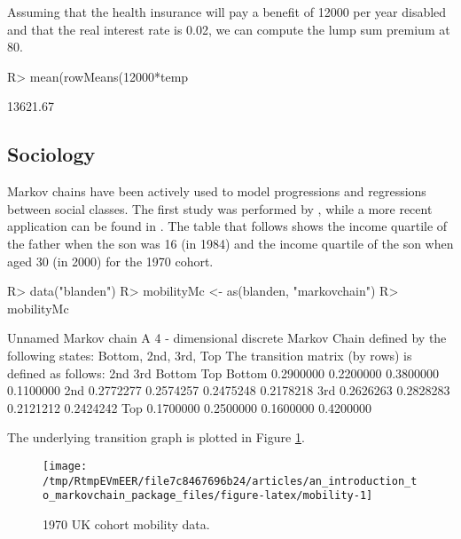 \documentclass[
  nojss]{jss}
\begin{document}
Assuming that the health insurance will pay a benefit of 12000 per year disabled and that the real interest rate is 0.02, we can compute the lump sum premium at 80.

\begin{CodeChunk}

\begin{CodeInput}
R> mean(rowMeans(12000*temp%
\end{CodeInput}

\begin{CodeOutput}
[1] 13621.67
\end{CodeOutput}
\end{CodeChunk}

\hypertarget{app:sociology}{%
\subsection{Sociology}\label{app:sociology}}

Markov chains have been actively used to model progressions and regressions between social classes. The first study was performed by \cite{glassHall}, while a more recent application can be found in \cite{blandenEtAlii}. The table that follows shows the income quartile of the father when the son was 16 (in 1984) and the income quartile of the son when aged 30 (in 2000) for the 1970 cohort.

\begin{CodeChunk}

\begin{CodeInput}
R> data("blanden")
R> mobilityMc <- as(blanden, "markovchain")
R> mobilityMc
\end{CodeInput}

\begin{CodeOutput}
Unnamed Markov chain 
 A  4 - dimensional discrete Markov Chain defined by the following states: 
 Bottom, 2nd, 3rd, Top 
 The transition matrix  (by rows)  is defined as follows: 
             2nd       3rd    Bottom       Top
Bottom 0.2900000 0.2200000 0.3800000 0.1100000
2nd    0.2772277 0.2574257 0.2475248 0.2178218
3rd    0.2626263 0.2828283 0.2121212 0.2424242
Top    0.1700000 0.2500000 0.1600000 0.4200000
\end{CodeOutput}
\end{CodeChunk}

The underlying transition graph is plotted in Figure \ref{fig:mobility}.

\begin{CodeChunk}
\begin{figure}

{\centering \texttt{[image: /tmp/RtmpEVmEER/file7c8467696b24/articles/an\_introduction\_to\_markovchain\_package\_files/figure-latex/mobility-1]} 

}

\caption[1970 UK cohort mobility data]{1970 UK cohort mobility data.}\label{fig:mobility}
\end{figure}
\end{CodeChunk}
\end{document}
